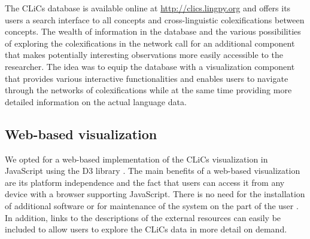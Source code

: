 The CLiCs database is available online at \url{http://clics.lingpy.org} and offers its users a search interface to all concepts and cross-linguistic colexifications between concepts. The wealth of information in the database and the various possibilities of exploring the colexifications in the network call for an additional component that makes potentially interesting observations more easily accessible to the researcher. The idea was to equip the database with a visualization component that provides various interactive functionalities and enables users to navigate through the networks of colexifications while at the same time providing more detailed information on the actual language data. 
\nocite{Wold2009,Key2007}
\subsection{Web-based visualization}

We opted for a web-based implementation of the CLiCs visualization in JavaScript using the D3 library \cite{D3}. The main benefits of a web-based visualization are its platform independence and the fact that users can access it from any device with a browser supporting JavaScript. There is no need for the installation of additional software or for maintenance of the system on the part of the user \cite{Murray}. In addition, links to the descriptions of the external resources can easily be included to allow users to explore the CLiCs data in more detail on demand. 

